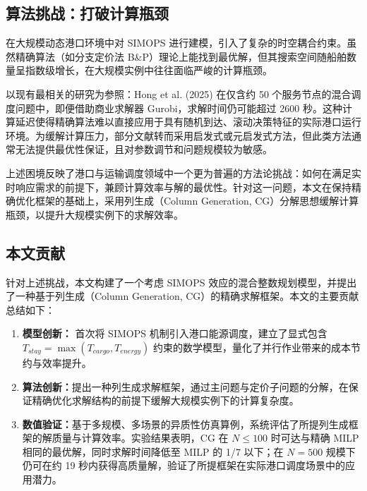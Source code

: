 \documentclass[UTF8, a4paper, 12pt]{ctexart}
\begin{document}
\subsection{算法挑战：打破计算瓶颈}
在大规模动态港口环境中对 SIMOPS 进行建模，引入了复杂的时空耦合约束。虽然精确算法（如分支定价法 B\&P）理论上能找到最优解，但其搜索空间随船舶数量呈指数级增长，在大规模实例中往往面临严峻的计算瓶颈。

以现有最相关的研究为参照：Hong et al. (2025) \cite{Hong2025} 在仅含约 50 个服务节点的混合调度问题中，即便借助商业求解器 Gurobi，求解时间仍可能超过 2600 秒。这种计算延迟使得精确算法难以直接应用于具有随机到达、滚动决策特征的实际港口运行环境。为缓解计算压力，部分文献转而采用启发式或元启发式方法，但此类方法通常无法提供最优性保证，且对参数调节和问题规模较为敏感。

上述困境反映了港口与运输调度领域中一个更为普遍的方法论挑战：如何在满足实时响应需求的前提下，兼顾计算效率与解的最优性。针对这一问题，本文在保持精确优化框架的基础上，采用列生成（Column Generation, CG）分解思想缓解计算瓶颈，以提升大规模实例下的求解效率。

\subsection{本文贡献}
针对上述挑战，本文构建了一个考虑 SIMOPS 效应的混合整数规划模型，并提出了一种基于列生成（Column Generation, CG）的精确求解框架。本文的主要贡献总结如下：
\begin{enumerate}
    \item \textbf{模型创新：} 首次将 SIMOPS 机制引入港口能源调度，建立了显式包含 $T_{stay} = \max(T_{cargo}, T_{energy})$ 约束的数学模型，量化了并行作业带来的成本节约与效率提升。
    \item \textbf{算法创新：}提出一种列生成求解框架，通过主问题与定价子问题的分解，在保证精确优化求解结构的前提下缓解大规模实例下的计算复杂度。
    \item \textbf{数值验证：}基于多规模、多场景的异质性仿真算例，系统评估了所提列生成框架的解质量与计算效率。实验结果表明，CG 在 $N \le 100$ 时可达与精确 MILP 相同的最优解，同时求解时间降低至 MILP 的 1/7 以下；在 $N = 500$ 规模下仍可在约 19 秒内获得高质量解，验证了所提框架在实际港口调度场景中的应用潜力。
\end{enumerate}

\end{document}
